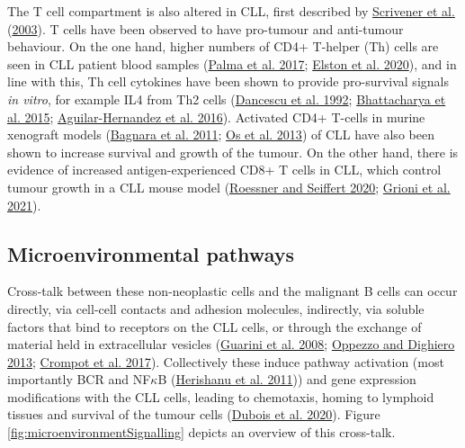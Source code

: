 \documentclass[11pt, a4paper, twosided]{book}
\begin{document}
The T cell compartment is also altered in CLL, first described by \protect\hyperlink{ref-Scrivener2003}{Scrivener et al.} (\protect\hyperlink{ref-Scrivener2003}{2003}). T cells have been observed to have pro-tumour and anti-tumour behaviour. On the one hand, higher numbers of CD4+ T-helper (Th) cells are seen in CLL patient blood samples (\protect\hyperlink{ref-Palma2017}{Palma et al. 2017}; \protect\hyperlink{ref-Elston2020}{Elston et al. 2020}), and in line with this, Th cell cytokines have been shown to provide pro-survival signals \emph{in vitro}, for example IL4 from Th2 cells (\protect\hyperlink{ref-Dancescu1992}{Dancescu et al. 1992}; \protect\hyperlink{ref-Bhattacharya2015}{Bhattacharya et al. 2015}; \protect\hyperlink{ref-AguilarHernandez2016}{Aguilar-Hernandez et al. 2016}). Activated CD4+ T-cells in murine xenograft models (\protect\hyperlink{ref-Bagnara2011}{Bagnara et al. 2011}; \protect\hyperlink{ref-Os2013}{Os et al. 2013}) of CLL have also been shown to increase survival and growth of the tumour. On the other hand, there is evidence of increased antigen-experienced CD8+ T cells in CLL, which control tumour growth in a CLL mouse model (\protect\hyperlink{ref-Roessner2020}{Roessner and Seiffert 2020}; \protect\hyperlink{ref-Grioni2021}{Grioni et al. 2021}).

\hypertarget{intro-microenvironmental-pathways}{%
\subsection{Microenvironmental pathways}\label{intro-microenvironmental-pathways}}

Cross-talk between these non-neoplastic cells and the malignant B cells can occur directly, via cell-cell contacts and adhesion molecules, indirectly, via soluble factors that bind to receptors on the CLL cells, or through the exchange of material held in extracellular vesicles (\protect\hyperlink{ref-Guarini2008}{Guarini et al. 2008}; \protect\hyperlink{ref-Oppezzo2013}{Oppezzo and Dighiero 2013}; \protect\hyperlink{ref-Crompot2017}{Crompot et al. 2017}). Collectively these induce pathway activation (most importantly BCR and NF\(\kappa\)B (\protect\hyperlink{ref-Herishanu2011}{Herishanu et al. 2011})) and gene expression modifications with the CLL cells, leading to chemotaxis, homing to lymphoid tissues and survival of the tumour cells (\protect\hyperlink{ref-Dubois2020}{Dubois et al. 2020}). Figure \ref{fig:microenvironmentSignalling} depicts an overview of this cross-talk.
\end{document}
